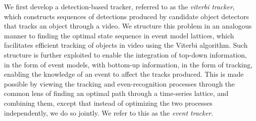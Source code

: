We first develop a detection-based tracker, referred to as the \emph{viterbi
  tracker}, which constructs sequences of detections produced by candidate
object detectors that tracks an object through a video.
%
We structure this problem in an analogous manner to finding the optimal state
sequence in event model lattices, which facilitates efficient tracking of
objects in video using the Viterbi algorithm.
%
Such structure is further exploited to enable the integration of top-down
information, in the form of event models, with bottom-up information, in the
form of tracking, enabling the knowledge of an event to affect the tracks
produced.
%
This is made possible by viewing the tracking and even-recognition processes
through the common lens of finding an optimal path through a time-series
lattice, and combining them, except that instead of optimizing the two
processes independently, we do so jointly.
%
We refer to this as the \emph{event tracker}.

